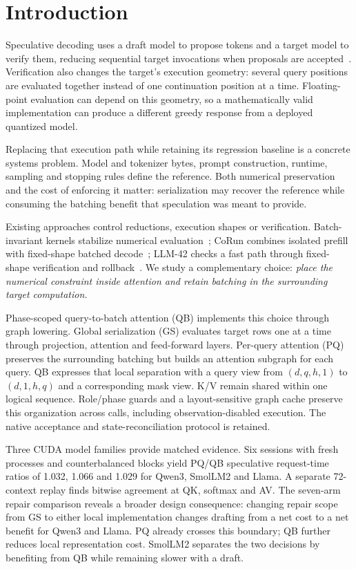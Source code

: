 \section{Introduction}
Speculative decoding uses a draft model to propose tokens and a target model to verify them, reducing sequential target invocations when proposals are accepted~\cite{leviathan2023,chen2023}. Verification also changes the target's execution geometry: several query positions are evaluated together instead of one continuation position at a time. Floating-point evaluation can depend on this geometry, so a mathematically valid implementation can produce a different greedy response from a deployed quantized model.

Replacing that execution path while retaining its regression baseline is a concrete systems problem. Model and tokenizer bytes, prompt construction, runtime, sampling and stopping rules define the reference. Both numerical preservation and the cost of enforcing it matter: serialization may recover the reference while consuming the batching benefit that speculation was meant to provide.

Existing approaches control reductions, execution shapes or verification. Batch-invariant kernels stabilize numerical evaluation~\cite{thinkingmachines}; CoRun combines isolated prefill with fixed-shape batched decode~\cite{corun}; LLM-42 checks a fast path through fixed-shape verification and rollback~\cite{llm42}. We study a complementary choice: \emph{place the numerical constraint inside attention and retain batching in the surrounding target computation.}

Phase-scoped query-to-batch attention (QB) implements this choice through graph lowering. Global serialization (GS) evaluates target rows one at a time through projection, attention and feed-forward layers. Per-query attention (PQ) preserves the surrounding batching but builds an attention subgraph for each query. QB expresses that local separation with a query view from $(d,q,h,1)$ to $(d,1,h,q)$ and a corresponding mask view. K/V remain shared within one logical sequence. Role/phase guards and a layout-sensitive graph cache preserve this organization across calls, including observation-disabled execution. The native acceptance and state-reconciliation protocol is retained.

Three CUDA model families provide matched evidence. Six sessions with fresh processes and counterbalanced blocks yield PQ/QB speculative request-time ratios of 1.032, 1.066 and 1.029 for Qwen3, SmolLM2 and Llama. A separate 72-context replay finds bitwise agreement at QK, softmax and AV. The seven-arm repair comparison reveals a broader design consequence: changing repair scope from GS to either local implementation changes drafting from a net cost to a net benefit for Qwen3 and Llama. PQ already crosses this boundary; QB further reduces local representation cost. SmolLM2 separates the two decisions by benefiting from QB while remaining slower with a draft.

